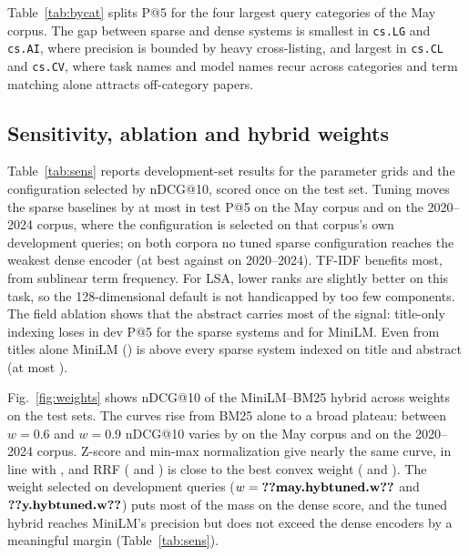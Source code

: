 \documentclass[conference]{IEEEtran}
\begin{document}
Table~\ref{tab:bycat} splits P@5 for the four largest query categories of the May corpus. The gap between sparse and dense systems is smallest in \texttt{cs.LG} and \texttt{cs.AI}, where precision is bounded by heavy cross-listing, and largest in \texttt{cs.CL} and \texttt{cs.CV}, where task names and model names recur across categories and term matching alone attracts off-category papers.



\subsection{Sensitivity, ablation and hybrid weights}

Table~\ref{tab:sens} reports development-set results for the parameter grids and the configuration selected by nDCG@10, scored once on the test set. Tuning moves the sparse baselines by at most  in test P@5 on the May corpus and  on the 2020--2024 corpus, where the configuration is selected on that corpus's own development queries; on both corpora no tuned sparse configuration reaches the weakest dense encoder (at best  against  on 2020--2024). TF-IDF benefits most, from sublinear term frequency. For LSA, lower ranks are slightly better on this task, so the 128-dimensional default is not handicapped by too few components. The field ablation shows that the abstract carries most of the signal: title-only indexing loses  in dev P@5 for the sparse systems and  for MiniLM. Even from titles alone MiniLM () is above every sparse system indexed on title and abstract (at most ).



Fig.~\ref{fig:weights} shows nDCG@10 of the MiniLM--BM25 hybrid across weights on the test sets. The curves rise from BM25 alone to a broad plateau: between $w=0.6$ and $w=0.9$ nDCG@10 varies by  on the May corpus and  on the 2020--2024 corpus. Z-score and min-max normalization give nearly the same curve, in line with \cite{bruch2022fusion}, and RRF ( and ) is close to the best convex weight ( and ). The weight selected on development queries ($w=\val{may.hybtuned.w}$ and $\val{y.hybtuned.w}$) puts most of the mass on the dense score, and the tuned hybrid reaches MiniLM's precision but does not exceed the dense encoders by a meaningful margin (Table~\ref{tab:sens}).
\end{document}
